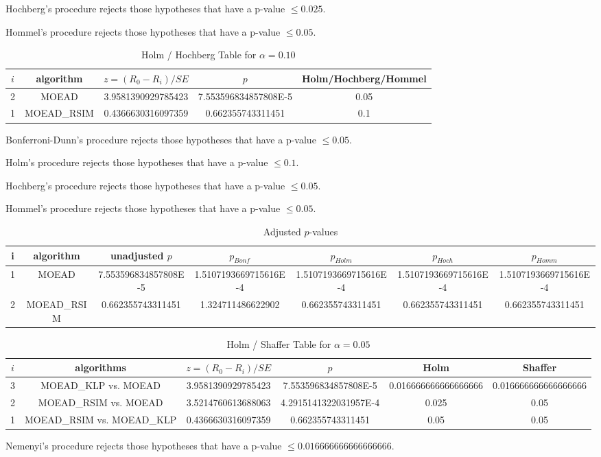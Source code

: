 \documentclass[a4paper,10pt]{article}
\begin{document}
\begin{landscape}
Hochberg's procedure rejects those hypotheses that have a p-value $\le0.025$.


Hommel's procedure rejects those hypotheses that have a p-value $\le0.05$.


\begin{table}[!htp]
\centering\tiny
\caption{Holm / Hochberg Table for $\alpha=0.10$}
\begin{tabular}{ccccc}
$i$&algorithm&$z=(R_0 - R_i)/SE$&$p$&Holm/Hochberg/Hommel\\
\hline
2&MOEAD&3.9581390929785423&7.553596834857808E-5&0.05\\
1&MOEAD_RSIM&0.4366630316097359&0.662355743311451&0.1\\
\hline
\end{tabular}
\end{table}
Bonferroni-Dunn's procedure rejects those hypotheses that have a p-value $\le0.05$.


Holm's procedure rejects those hypotheses that have a p-value $\le0.1$.


Hochberg's procedure rejects those hypotheses that have a p-value $\le0.05$.


Hommel's procedure rejects those hypotheses that have a p-value $\le0.05$.


\begin{table}[!htp]
\centering\tiny
\caption{Adjusted $p$-values}
\begin{tabular}{ccccccc}
i&algorithm&unadjusted $p$&$p_{Bonf}$&$p_{Holm}$&$p_{Hoch}$&$p_{Homm}$\\
\hline
1&MOEAD&7.553596834857808E-5&1.5107193669715616E-4&1.5107193669715616E-4&1.5107193669715616E-4&1.5107193669715616E-4\\
2&MOEAD_RSIM&0.662355743311451&1.324711486622902&0.662355743311451&0.662355743311451&0.662355743311451\\
\hline
\end{tabular}
\end{table}

\begin{table}[!htp]
\centering\tiny
\caption{Holm / Shaffer Table for $\alpha=0.05$}
\begin{tabular}{cccccc}
$i$&algorithms&$z=(R_0 - R_i)/SE$&$p$&Holm&Shaffer\\
\hline
3&MOEAD_KLP vs. MOEAD&3.9581390929785423&7.553596834857808E-5&0.016666666666666666&0.016666666666666666\\
2&MOEAD_RSIM vs. MOEAD&3.5214760613688063&4.2915141322031957E-4&0.025&0.05\\
1&MOEAD_RSIM vs. MOEAD_KLP&0.4366630316097359&0.662355743311451&0.05&0.05\\
\hline
\end{tabular}
\end{table}
Nemenyi's procedure rejects those hypotheses that have a p-value $\le0.016666666666666666$.



\end{landscape}
\end{document}
